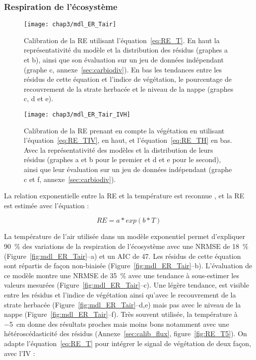 \subsubsection{Respiration de l'écosystème}

\begin{figure} %
\centering
\texttt{[image: chap3/mdl\_ER\_Tair]}
\caption{\label{fig:mdl_ER_Tair}
Calibration de la RE utilisant l'équation~\ref{eq:RE_T}. En haut la représentativité du modèle et la distribution des résidus (graphes a et b), ainsi que son évaluation sur un jeu de données indépendant (graphe c, annexe~\ref{sec:carbiodiv}). En bas les tendances entre les résidus de cette équation et l'indice de végétation, le pourcentage de recouvrement de la strate herbacée et le niveau de la nappe (graphes c, d et e).}
\texttt{[image: chap3/mdl\_ER\_Tair\_IVH]}
\caption{\label{fig:ER_mdl_TairIVH}Calibration de la RE prenant en compte la végétation en utilisant l'équation~\ref{eq:RE_TIV}, en haut, et l'équation~\ref{eq:RE_TH} en bas. Avec la représentativité des modèles et la distribution de leurs résidus (graphes a et b pour le premier et d et e pour le second), ainsi que leur évaluation sur un jeu de données indépendant (graphe c et f, annexe~\ref{sec:carbiodiv}).}
\end{figure}

La relation exponentielle entre la RE et la température est reconnue \citep{luo2006}, et la RE est estimée avec l'équation :

\begin{equation} \label{eq:RE_T}
RE = a*exp(b*T)
\end{equation}

La température de l'air utilisée dans un modèle exponentiel permet d'expliquer \SI{90}{\percent} des variations de la respiration de l'écosystème avec une NRMSE de \SI{18}{\percent} (Figure~\ref{fig:mdl_ER_Tair}--a) et un AIC de 47.
Les résidus de cette équation sont répartis de façon non-biaisée (Figure~\ref{fig:mdl_ER_Tair}--b).
L'évaluation de ce modèle montre une NRMSE de \SI{35}{\percent} avec une tendance à sous-estimer les valeurs mesurées (Figure~\ref{fig:mdl_ER_Tair}--c).
Une légère tendance, est visible entre les résidus et l'indice de végétation ainsi qu'avec le recouvrement de la strate herbacée (Figure~\ref{fig:mdl_ER_Tair}--d,e) mais pas avec le niveau de la nappe (Figure~\ref{fig:mdl_ER_Tair}--f).
Très souvent utilisée, la température à \SI{-5}{\centi\metre} donne des résultats proches mais moins bons notamment avec une hétéroscédasticité des résidus (Annexe~\ref{sec:calib_flux}, figure~\ref{fig:RE_T5}).
On adapte l'équation~\ref{eq:RE_T} pour intégrer le signal de végétation de deux façon, avec l'IV :

